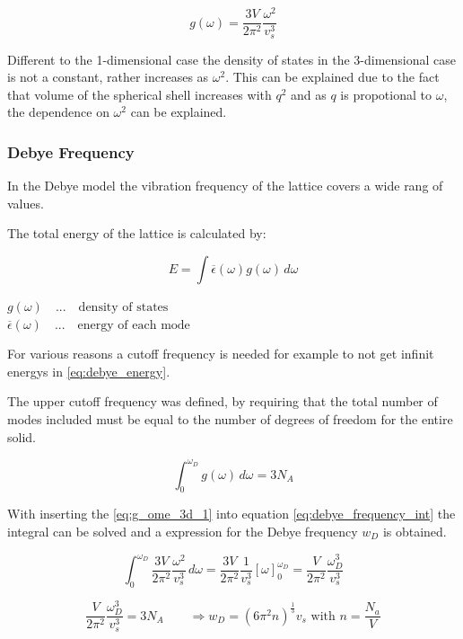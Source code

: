 \begin{equation}
    g(\omega) = \frac{3V}{2\pi^2} \frac{\omega^2}{v_s^3}
\end{equation}

Different to the 1-dimensional case the density of states
in the 3-dimensional case is not a constant, rather increases
as $\omega^2$. This can be explained due to the fact that volume of the 
spherical shell increases with $q^2$ and as $q$ is propotional to 
$\omega$, the dependence on $\omega^2$ can be explained.

\subsubsection*{Debye Frequency}

In the Debye model the vibration frequency of the lattice covers
a wide rang of values.

The total energy of the lattice is calculated by:

\begin{equation}
    E = \int \overline{\epsilon}(\omega) g(\omega) \, d\omega
    \label{eq:debye_energy}
\end{equation}

$g(\omega) \quad ... \quad \textrm{density of states}$\\
$\overline{\epsilon}(\omega) \quad ... \quad \textrm{energy of each mode}$

For various reasons a cutoff frequency is needed for example to not get
infinit energys in \autoref{eq:debye_energy}.

The upper cutoff frequency was defined, by requiring that the total number of 
modes included must be equal to the number of degrees of freedom for the entire
solid.

\begin{equation}
    \int_0^{\omega_D} g(\omega) \, d\omega = 3N_A
    \label{eq:debye_frequency_int}
\end{equation}

With inserting the \autoref{eq:g_ome_3d_1} into equation 
\autoref{eq:debye_frequency_int} the integral can be solved and 
a expression for the Debye frequency $w_D$ is obtained.

$$\int_0^{\omega_D} \frac{3V}{2\pi^2} \frac{\omega^2}{v_s^3} \, d\omega = 
    \frac{3V}{2\pi^2} \frac{1}{v_s^3} \left[\omega\right]_0^{\omega_D} =
    \frac{V}{2\pi^2} \frac{\omega_D^3}{v_s^3}
$$

$$ \frac{V}{2\pi^2} \frac{\omega_D^3}{v_s^3} = 3N_A \qquad \Rightarrow
    w_D = (6\pi^2 n)^{\frac{1}{3}} v_s \textrm{ with } n=\frac{N_a}{V}$$

